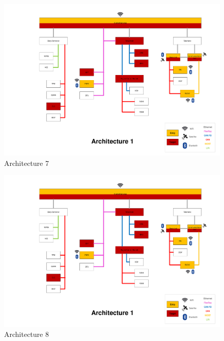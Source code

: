 \begin{figure}[h]
    \centering
    \includegraphics[width=\textwidth, page=7]{../Architectures-survey.pdf}
    \caption{Architecture 7}
    \label{fig:architecture7}
\end{figure}

\begin{figure}[h]
    \centering
    \includegraphics[width=\textwidth, page=8]{../Architectures-survey.pdf}
    \caption{Architecture 8}
    \label{fig:architecture8}
\end{figure}

